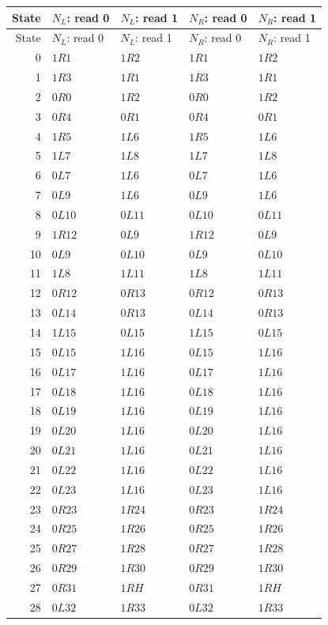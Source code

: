 {\small
\begin{longtable}{@{}rllll@{}}
\toprule State & $N_L$: read 0 & $N_L$: read 1 & $N_R$: read 0 & $N_R$: read 1\\\midrule\endfirsthead
\toprule State & $N_L$: read 0 & $N_L$: read 1 & $N_R$: read 0 & $N_R$: read 1\\\midrule\endhead
0 & $1R1$ & $1R2$ & $1R1$ & $1R2$\\
1 & $1R3$ & $1R1$ & $1R3$ & $1R1$\\
2 & $0R0$ & $1R2$ & $0R0$ & $1R2$\\
3 & $0R4$ & $0R1$ & $0R4$ & $0R1$\\
4 & $1R5$ & $1L6$ & $1R5$ & $1L6$\\
5 & $1L7$ & $1L8$ & $1L7$ & $1L8$\\
6 & $0L7$ & $1L6$ & $0L7$ & $1L6$\\
7 & $0L9$ & $1L6$ & $0L9$ & $1L6$\\
8 & $0L10$ & $0L11$ & $0L10$ & $0L11$\\
9 & $1R12$ & $0L9$ & $1R12$ & $0L9$\\
10 & $0L9$ & $0L10$ & $0L9$ & $0L10$\\
11 & $1L8$ & $1L11$ & $1L8$ & $1L11$\\
12 & $0R12$ & $0R13$ & $0R12$ & $0R13$\\
13 & $0L14$ & $0R13$ & $0L14$ & $0R13$\\
14 & $1L15$ & $0L15$ & $1L15$ & $0L15$\\
15 & $0L15$ & $1L16$ & $0L15$ & $1L16$\\
16 & $0L17$ & $1L16$ & $0L17$ & $1L16$\\
17 & $0L18$ & $1L16$ & $0L18$ & $1L16$\\
18 & $0L19$ & $1L16$ & $0L19$ & $1L16$\\
19 & $0L20$ & $1L16$ & $0L20$ & $1L16$\\
20 & $0L21$ & $1L16$ & $0L21$ & $1L16$\\
21 & $0L22$ & $1L16$ & $0L22$ & $1L16$\\
22 & $0L23$ & $1L16$ & $0L23$ & $1L16$\\
23 & $0R23$ & $1R24$ & $0R23$ & $1R24$\\
24 & $0R25$ & $1R26$ & $0R25$ & $1R26$\\
25 & $0R27$ & $1R28$ & $0R27$ & $1R28$\\
26 & $0R29$ & $1R30$ & $0R29$ & $1R30$\\
27 & $0R31$ & $1RH$ & $0R31$ & $1RH$\\
28 & $0L32$ & $1R33$ & $0L32$ & $1R33$\\

\end{longtable}}
